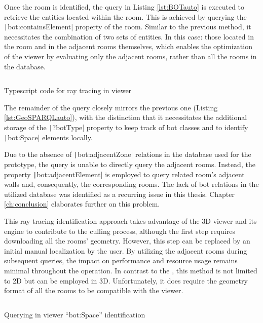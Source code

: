 Once the room is identified, the query in Listing \ref{lst:BOTauto} is executed to retrieve the entities located within the room. This is achieved by querying the \texttt|bot:containsElement| property of the room. Similar to the previous method, it necessitates the combination of two sets of entities. In this case: those located in the room and in the adjacent rooms themselves, which enables the optimization of the viewer by evaluating only the adjacent rooms, rather than all the rooms in the database.

\begin{listing}[H]
    \inputminted{ts}{dynamicQueries/inViewer/raytrace.ts}
    \vspace{-0.7cm}
    \caption{Typescript code for ray tracing in viewer}
    \label{lst:findRoom}
\end{listing}

The remainder of the query closely mirrors the previous one (Listing \ref{lst:GeoSPARQLauto}), with the distinction that it necessitates the additional storage of the \texttt|?botType| property to keep track of \ac{bot} classes and to identify \texttt|bot:Space| elements locally.

Due to the absence of \texttt|bot:adjacentZone| relations in the database used for the prototype, the query is unable to directly query the adjacent rooms. Instead, the property \texttt|bot:adjacentElement| is employed to query related room's adjacent walls and, consequently, the corresponding rooms. The lack of \ac{bot} relations in the utilized database was identified as a recurring issue in this thesis. Chapter \ref{ch:conclusion} elaborates further on this problem.

This ray tracing identification approach takes advantage of the 3D viewer and its engine to contribute to the culling process, although the first step requires downloading all the rooms' geometry. However, this step can be replaced by an initial manual localization by the user. By utilizing the adjacent rooms during subsequent queries, the impact on performance and resource usage remains minimal throughout the operation. In contrast to the , this method is not limited to 2D but can be employed in 3D. Unfortunately, it does require the geometry format of all the rooms to be compatible with the viewer.

\begin{listing}[H]
    \inputminted{sparql}{dynamicQueries/inViewer/query.rq}
    \vspace{-0.7cm}
    \caption{Querying in viewer \enquote{bot:Space} identification}
    \label{lst:BOTauto}
\end{listing}

